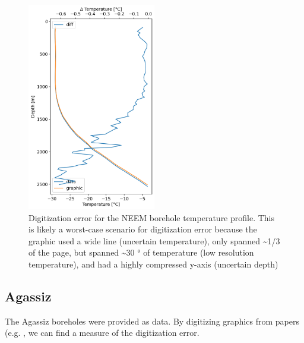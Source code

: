 \documentclass[article,a4paper,times,11pt,twoside]{article}
\begin{document}
\begin{figure}[!h]
\centering
\includegraphics[width=0.5\textwidth]{./fig/neem_diff.png}
\caption{\label{fig:err_NEEM}Digitization error for the NEEM borehole temperature profile. This is likely a worst-case scenario for digitization error because the graphic used a wide line (uncertain temperature), only spanned \textasciitilde{}1/3 of the page, but spanned \textasciitilde{}30 ° of temperature (low resolution temperature), and had a highly compressed y-axis (uncertain depth)}
\end{figure}


\subsection{Agassiz}
\label{sec:org4500e6f}

The Agassiz boreholes were provided as data. By digitizing graphics from papers (e.g. \textcite{clarke_1987_wind}, we can find a measure of the digitization error.
\end{document}
